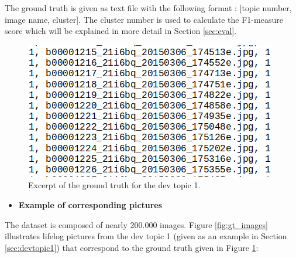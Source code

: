     The ground truth is given as text file with the following format : [topic number, image name, cluster].
    The cluster number is used to calculate the F1-measure score which will be explained in more detail in Section \ref{sec:eval}.


    \begin{figure}[htb]
        
        \centering
        \captionsetup{justification=centering}
        \includegraphics[scale = 0.55]{Sections/5ImageClef/images/gt_t1.png}
        \caption[Ground truth excerpt]{Excerpt of the ground truth for the dev topic 1.}  
        \label{fig:gt}
    \end{figure}

    \begin{itemize}
        \item    \textbf{Example of corresponding pictures}
    \end{itemize}
 

    The dataset is composed of nearly 200.000 images. Figure \ref{fig:gt_images} illustrates lifelog pictures from the dev topic 1 (given as an example in Section \ref{sec:devtopic1}) that correspond to the ground truth given in Figure \ref{fig:gt}:


